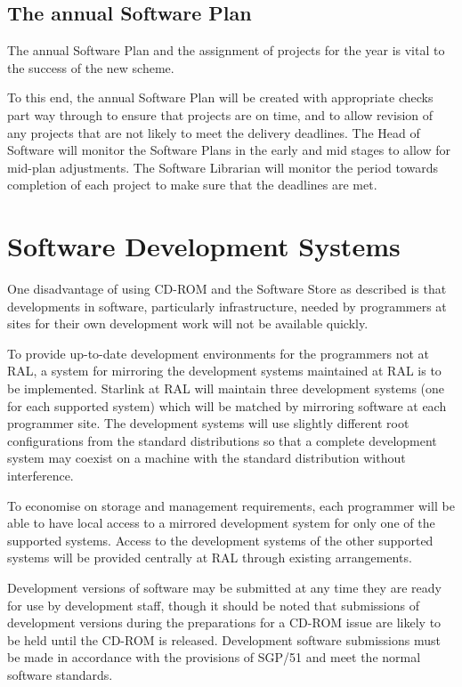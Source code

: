 \documentclass[twoside,11pt]{article}
\newcommand{\xlabel}[1]{}
\begin{document}
\subsection{\label{the_annual_software_plan}\xlabel{the_annual_software_plan}The annual Software Plan}

The annual Software Plan and the assignment of projects for the year is
vital to the success of the new scheme.

To this end, the annual Software Plan will be created with appropriate
checks part way through to ensure that projects are on time, and to
allow revision of any projects that are not likely to meet the delivery
deadlines.  The Head of Software will monitor the Software Plans in the
early and mid stages to allow for mid-plan adjustments.  The Software
Librarian will monitor the period towards completion of each project to
make sure that the deadlines are met.

\section{\label{software_development_systems}\xlabel{software_development_systems}Software Development Systems}

One disadvantage of using CD-ROM and the Software Store as described is
that developments in software, particularly infrastructure, needed by
programmers at sites for their own development work will not be available
quickly.

To provide up-to-date development environments for the programmers not at
RAL, a system for mirroring the development systems maintained at RAL is to
be implemented.  Starlink at RAL will maintain three development systems 
(one for each supported system) which will be matched by mirroring
software at each programmer site.   The development systems will use
slightly different root configurations from the standard distributions so
that a complete development system may coexist on a machine with the
standard distribution without interference.

To economise on storage and management requirements, each programmer
will be able to have local access to a mirrored development system for
only one of the supported systems.  Access to the development systems
of the other supported systems will be provided centrally at RAL
through existing arrangements.

Development versions of software may be submitted at any time they are
ready for use by development staff, though it should be noted
that submissions of development versions during the preparations
for a CD-ROM issue are likely to be held until the CD-ROM is released. 
Development software submissions must be made in accordance with the 
provisions of SGP/51 and meet the normal software standards.
\end{document}
